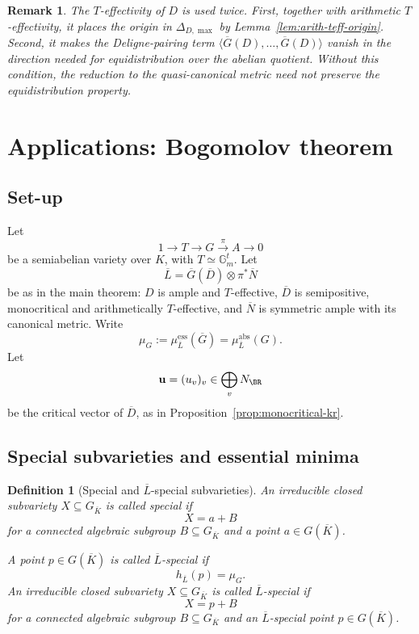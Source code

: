 \documentclass[10pt,a4paper]{amsart}
\theoremstyle{plain}
\newtheorem{definition}[theorem]{Definition}
\newtheorem{remark}[theorem]{Remark}
\newcommand{\Gm}{\mathbb{G}_m}
\theoremstyle{plain}
\numberwithin{equation}{section}
\providecommand{\bD}{\overline{D}}
\providecommand{\bL}{\overline{L}}
\providecommand{\bN}{\overline{N}}
\providecommand{\muess}{\mu^{\mathrm{ess}}}
\providecommand{\muabs}{\mu^{\mathrm{abs}}}
\begin{document}
\begin{remark}
	The \(T\)-effectivity of \(D\) is used twice.  First, together with arithmetic
	\(T\)-effectivity, it places the origin in \(\Delta_{D,\max}\) by
	Lemma~\ref{lem:arith-teff-origin}.  Second, it makes the Deligne-pairing term
	\(\langle \overline G(D),\ldots,\overline G(D)\rangle\) vanish in the direction
	needed for equidistribution over the abelian quotient.  Without this condition,
	the reduction to the quasi-canonical metric need not preserve the
	equidistribution property.
\end{remark}


\section{Applications: Bogomolov theorem}

\subsection{Set-up}

Let
\[
1\longrightarrow T\longrightarrow G\xrightarrow{\pi}A\longrightarrow0
\]
be a semiabelian variety over \(K\), with \(T\simeq\Gm^t\).  Let
\[
\bL=\overline G(\bD)\otimes\pi^*\bN
\]
be as in the main theorem: \(D\) is ample and \(T\)-effective,
\(\bD\) is semipositive, monocritical and arithmetically \(T\)-effective, and
\(\bN\) is symmetric ample with its canonical metric.  Write
\[
\mu_G:=\muess_{\bL}(\overline G)=\muabs_{\bL}(G).
\]
Let
\[
\mathbf u=(u_v)_v\in\bigoplus_vN_{\BR}
\]
be the critical vector of \(\bD\), as in
Proposition~\ref{prop:monocritical-kr}.

\subsection{Special subvarieties and essential minima}

\begin{definition}[Special and \(\bL\)-special subvarieties]
	An irreducible closed subvariety \(X\subseteq G_{\overline{K}}\) is called
	\emph{special} if
	\[
	X=a+B
	\]
	for a connected algebraic subgroup \(B\subseteq G_{\overline{K}}\) and a point
	\(a\in G(\overline{K})\).
	
	A point \(p\in G(\overline{K})\) is called \(\bL\)-special if
	\[
	h_{\bL}(p)=\mu_G.
	\]
	An irreducible closed subvariety \(X\subseteq G_{\overline{K}}\) is called
	\(\bL\)-special if
	\[
	X=p+B
	\]
	for a connected algebraic subgroup \(B\subseteq G_{\overline{K}}\) and an
	\(\bL\)-special point \(p\in G(\overline{K})\).
\end{definition}
\end{document}
